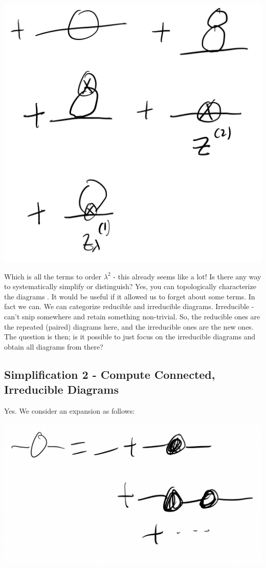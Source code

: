\begin{center}
    \includegraphics[scale=0.3]{Images/fig-lec27feynman3.png}
\end{center}

Which is all the terms to order $\lambda^2$ - this already seems like a lot! Is there any way to systematically simplify or distinguish? Yes, you can topologically characterize the diagrams . It would be useful if it allowed us to forget about some terms. In fact we can. We can categorize reducible and irreducible diagrams. Irreducible - can't snip somewhere and retain something non-trivial. So, the reducible ones are the repeated (paired) diagrams here, and the irreducible ones are the new ones. The question is then; is it possible to just focus on the irreducible diagrams and obtain all diagrams from there?

\subsection{Simplification 2 - Compute Connected, Irreducible Diagrams}
Yes. We consider an expansion as follows:

\begin{center}
    \includegraphics[scale=0.3]{Images/fig-lec27feynman4.png}
\end{center}

